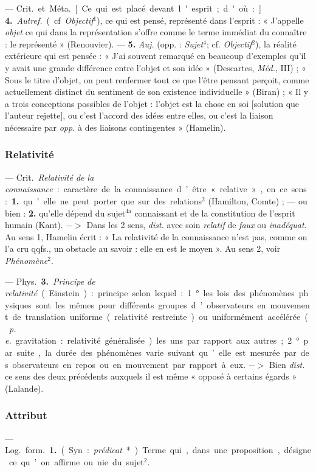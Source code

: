 — \si{Crit.} et \si{Méta.} [Ce qui est placé devant l'esprit; d'où :]. {\bf
4.} {\it Autref.} (cf. {\it Objectif}$^1$), ce qui est pensé, représenté dans
l'esprit : « J’appelle {\it objet} ce qui dans la représentation s'offre
comme le terme immédiat du connaître : le représenté » (Renouvier). — {\bf
5.} {\it Auj.} (opp. : {\it Sujet}$^4$; cf. {\it Objectif}$^2$), la réalité
extérieure qui est pensée : « J’ai souvent remarqué en beaucoup d'exemples
qu'il y avait une grande différence entre l’objet et son idée » (Descartes,
{\it Méd.}, III) ; « Sous le titre d'objet, on peut renfermer tout ce que
l'être pensant perçoit, comme actuellement distinct du sentiment de son
existence individuelle » (Biran) ; « Il
y a trois conceptions possibles de l’objet : l'objet est la chose en soi
[solution que l’auteur rejette], ou c’est l’accord des idées entre elles, ou
c’est la liaison nécessaire par {\it opp.} à des liaisons
contingentes » (Hamelin).

\subsubsection{Relativité}
 — \si{Crit.} {\it Relativité de la connaissance} : caractère
de la connaissance d’être « relative », en ce sens : {\bf 1.} qu’elle ne peut
porter que sur des relations$^2$ (Hamilton, Comte) ; — ou bien : {\bf 2.}
qu’elle dépend du sujet$^\text{4a}$ connaissant et de la constitution de
l'esprit humain (Kant). $->$ Dans les 2 sens, {\it dist.} avec soin {\it
relatif} de {\it faux} ou {\it inadéquat}. Au sens 1, Hamelin écrit : « La
relativité de la connaissance n’est pas, comme on l’a cru qqfs., un obstacle
au savoir : elle en est le moyen ». Au sens 2, voir {\it Phénomène}$^2$.

— \si{Phys.} {\bf 3.} {\it Principe de relativité} (Einstein) : principe
selon lequel : 1° les lois des phénomènes physiques sont les mêmes pour
différents groupes d’observateurs en mouvement de translation uniforme
(relativité restreinte) ou uniformément accélérée ({\it p. e.} gravitation :
relativité généralisée) les uns par rapport aux autres; 2° par suite, la
durée des phénomènes varie suivant qu’elle est mesurée par des observateurs
en repos ou en mouvement par rapport à eux. $->$ Bien {\it dist.} ce sens des
deux précédents auxquels il est même « opposé à certains égards » (Lalande).

\subsubsection{Attribut}
 — \si{Log.} \si{form.} {\bf 1.} (Syn. : {\it prédicat}*). Terme qui, dans
une proposition, désigne ce qu’on affirme
ou nie du sujet$^2$.

